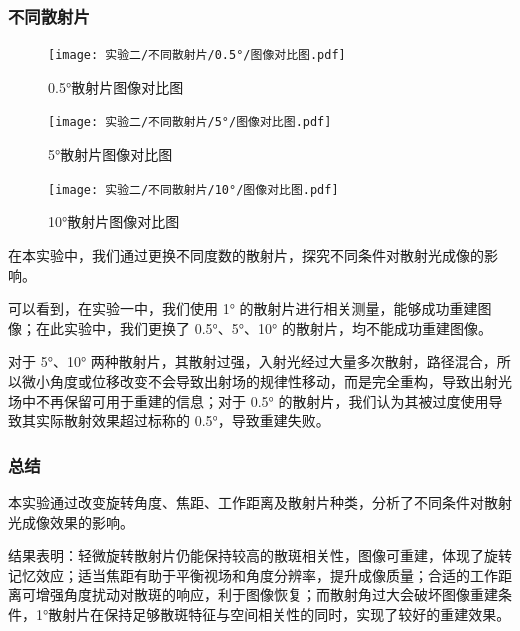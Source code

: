   




\subsubsection{不同散射片}
  \begin{figure}[H]
      \centering
      \texttt{[image: 实验二/不同散射片/0.5°/图像对比图.pdf]}
      \caption{0.5°散射片图像对比图}
  \end{figure}

  \begin{figure}[H]
      \centering
      \texttt{[image: 实验二/不同散射片/5°/图像对比图.pdf]}
      \caption{5°散射片图像对比图}
  \end{figure}

  \begin{figure}[H]
      \centering
      \texttt{[image: 实验二/不同散射片/10°/图像对比图.pdf]}
      \caption{10°散射片图像对比图}
  \end{figure}

  在本实验中，我们通过更换不同度数的散射片，探究不同条件对散射光成像的影响。

  可以看到，在实验一中，我们使用 1° 的散射片进行相关测量，能够成功重建图像；在此实验中，我们更换了 0.5°、5°、10° 的散射片，均不能成功重建图像。

  对于 5°、10° 两种散射片，其散射过强，入射光经过大量多次散射，路径混合，所以微小角度或位移改变不会导致出射场的规律性移动，而是完全重构，导致出射光场中不再保留可用于重建的信息；对于 0.5° 的散射片，我们认为其被过度使用导致其实际散射效果超过标称的 0.5°，导致重建失败。




\subsubsection{总结}

  本实验通过改变旋转角度、焦距、工作距离及散射片种类，分析了不同条件对散射光成像效果的影响。
  
  结果表明：轻微旋转散射片仍能保持较高的散斑相关性，图像可重建，体现了旋转记忆效应；适当焦距有助于平衡视场和角度分辨率，提升成像质量；合适的工作距离可增强角度扰动对散斑的响应，利于图像恢复；而散射角过大会破坏图像重建条件，1°散射片在保持足够散斑特征与空间相关性的同时，实现了较好的重建效果。


